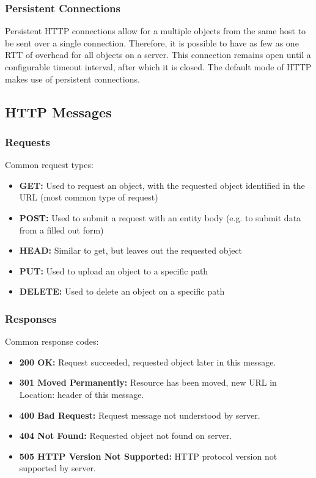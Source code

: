 \documentclass[12pt,titlepage]{article}
\begin{document}
      \subsubsection{Persistent Connections}
        Persistent HTTP connections allow for a multiple objects from the same host to be sent over a single connection. Therefore, it is possible to have as few as one RTT of
        overhead for all objects on a server. This connection remains open until a configurable timeout interval, after which it is closed. The default mode of HTTP makes use
        of persistent connections.

    \subsection{HTTP Messages}

      \subsubsection{Requests}
        Common request types:
        \begin{itemize}
          \item \textbf{GET:} Used to request an object, with the requested object identified in the URL (most common type of request)
          \item \textbf{POST:} Used to submit a request with an entity body (e.g. to submit data from a filled out form)
          \item \textbf{HEAD:} Similar to get, but leaves out the requested object
          \item \textbf{PUT:} Used to upload an object to a specific path
          \item \textbf{DELETE:} Used to delete an object on a specific path
        \end{itemize}

      \subsubsection{Responses}
        Common response codes:
        \begin{itemize}
          \item \textbf{200 OK:} Request succeeded, requested object later in this message.
          \item \textbf{301 Moved Permanently:} Resource has been moved, new URL in Location: header of this message.
          \item \textbf{400 Bad Request:} Request message not understood by server.
          \item \textbf{404 Not Found:} Requested object not found on server.
          \item \textbf{505 HTTP Version Not Supported:} HTTP protocol version not supported by server.
        \end{itemize}
\end{document}
